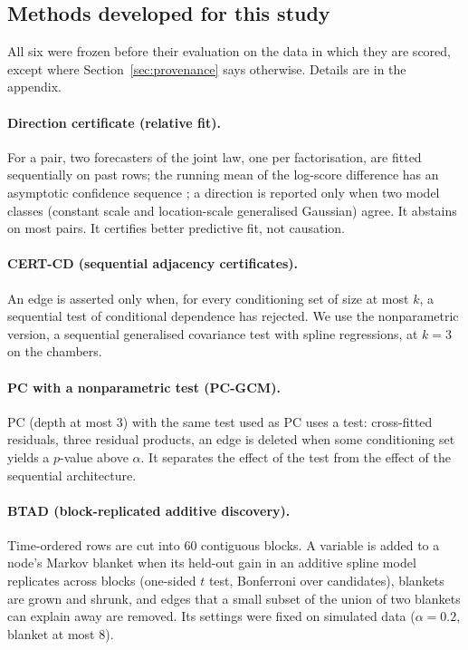 \subsection{Methods developed for this study}

All six were frozen before their evaluation on the data in which they are scored, except
where Section~\ref{sec:provenance} says otherwise. Details are in the appendix.

\paragraph{Direction certificate (relative fit).} For a pair, two forecasters of the joint
law, one per factorisation, are fitted sequentially on past rows; the running mean of the
log-score difference has an asymptotic confidence sequence
\citep{waudbysmith2024asymptotic}; a direction is reported only when two model classes
(constant scale and location-scale generalised Gaussian) agree. It abstains on most pairs.
It certifies better predictive fit, not causation.

\paragraph{CERT-CD (sequential adjacency certificates).} An edge is asserted only when,
for every conditioning set of size at most $k$, a sequential test of conditional dependence
has rejected. We use the nonparametric version, a sequential generalised covariance test
\citep{shah2020hardness} with spline regressions, at $k=3$ on the chambers.

\paragraph{PC with a nonparametric test (PC-GCM).} PC (depth at most $3$) with the same
test used as PC uses a test: cross-fitted residuals, three residual products, an edge is
deleted when some conditioning set yields a $p$-value above $\alpha$. It separates the effect of the
test from the effect of the sequential architecture.

\paragraph{BTAD (block-replicated additive discovery).} Time-ordered rows are cut into
$60$ contiguous blocks. A variable is added to a node's Markov blanket when its held-out
gain in an additive spline model replicates across blocks (one-sided $t$ test, Bonferroni
over candidates), blankets are grown and shrunk, and edges that a small subset of the union
of two blankets can explain away are removed. Its settings were fixed on simulated data
($\alpha=0.2$, blanket at most $8$).

